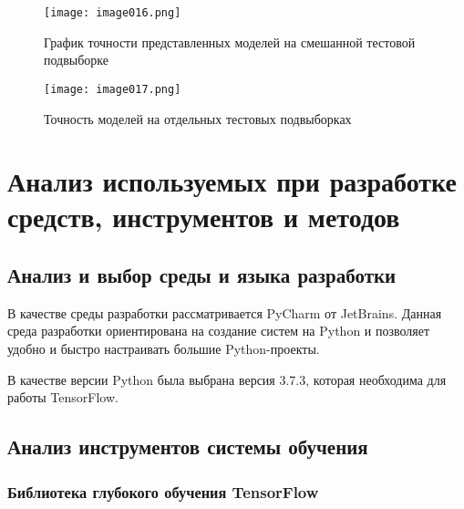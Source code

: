 \begin{figure}[htbp]
\centering
\texttt{[image: image016.png]}
\caption{График точности представленных моделей на смешанной тестовой подвыборке}%
\label{fig:how-to-do-research}
\end{figure}

\begin{figure}[htbp]
\centering
\texttt{[image: image017.png]}
\caption{Точность моделей на отдельных тестовых подвыборках}%
\label{fig:how-to-do-research}
\end{figure}

\section{Анализ используемых при разработке средств, инструментов и методов}

\subsection{Анализ и выбор среды и языка разработки}

В качестве среды разработки рассматривается PyCharm от JetBrains. Данная среда разработки ориентирована на создание систем на Python и позволяет удобно и быстро настраивать большие Python-проекты. 

В качестве версии Python была выбрана версия 3.7.3, которая необходима для работы TensorFlow.

\subsection{Анализ инструментов системы обучения}

\subsubsection{Библиотека глубокого обучения TensorFlow}

